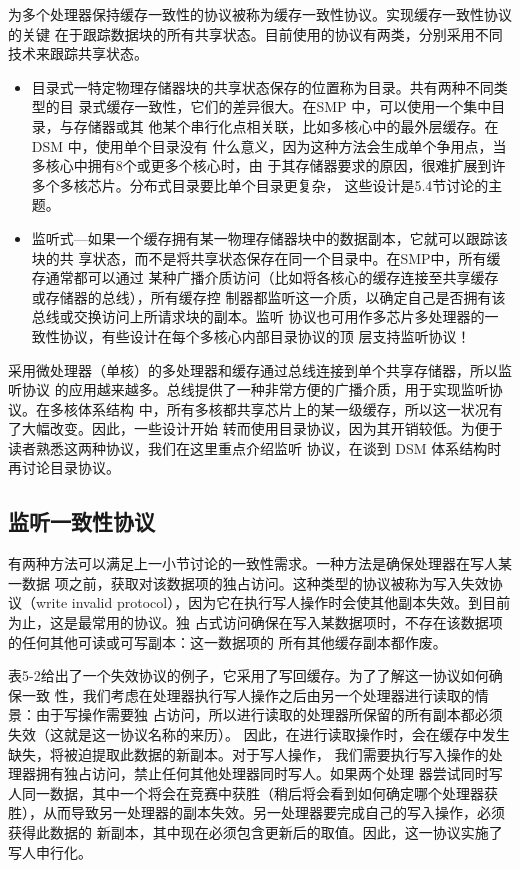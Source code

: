 为多个处理器保持缓存一致性的协议被称为缓存一致性协议。实现缓存一致性协议的关键
在于跟踪数据块的所有共享状态。目前使用的协议有两类，分别采用不同技术来跟踪共享状态。
\begin{itemize}
    \item 目录式一特定物理存储器块的共享状态保存的位置称为目录。共有两种不同类型的目
    录式缓存一致性，它们的差异很大。在SMP 中，可以使用一个集中目录，与存储器或其
    他某个串行化点相关联，比如多核心中的最外层缓存。在 DSM 中，使用单个目录没有
    什么意义，因为这种方法会生成单个争用点，当多核心中拥有8个或更多个核心时，由
    于其存储器要求的原因，很难扩展到许多个多核芯片。分布式目录要比单个目录更复杂，
    这些设计是5.4节讨论的主题。
    \item 监听式—如果一个缓存拥有某一物理存储器块中的数据副本，它就可以跟踪该块的共
    享状态，而不是将共享状态保存在同一个目录中。在SMP中，所有缓存通常都可以通过
    某种广播介质访问（比如将各核心的缓存连接至共享缓存或存储器的总线），所有缓存控
    制器都监听这一介质，以确定自己是否拥有该总线或交换访问上所请求块的副本。监听
    协议也可用作多芯片多处理器的一致性协议，有些设计在每个多核心内部目录协议的顶
    层支持监听协议！
\end{itemize}
采用微处理器（单核）的多处理器和缓存通过总线连接到单个共享存储器，所以监听协议
的应用越来越多。总线提供了一种非常方便的广播介质，用于实现监听协议。在多核体系结构
中，所有多核都共享芯片上的某一级缓存，所以这一状况有了大幅改变。因此，一些设计开始
转而使用目录协议，因为其开销较低。为便于读者熟悉这两种协议，我们在这里重点介绍监听
协议，在谈到 DSM 体系结构时再讨论目录协议。
\subsection{监听一致性协议}
有两种方法可以满足上一小节讨论的一致性需求。一种方法是确保处理器在写人某一数据
项之前，获取对该数据项的独占访问。这种类型的协议被称为写入失效协议（write invalid
protocol），因为它在执行写人操作时会使其他副本失效。到目前为止，这是最常用的协议。独
占式访问确保在写入某数据项时，不存在该数据项的任何其他可读或可写副本：这一数据项的
所有其他缓存副本都作废。

表5-2给出了一个失效协议的例子，它采用了写回缓存。为了了解这一协议如何确保一致
性，我们考虑在处理器执行写人操作之后由另一个处理器进行读取的情景：由于写操作需要独
占访问，所以进行读取的处理器所保留的所有副本都必须失效（这就是这一协议名称的来历）。
因此，在进行读取操作时，会在缓存中发生缺失，将被迫提取此数据的新副本。对于写人操作，
我们需要执行写入操作的处理器拥有独占访问，禁止任何其他处理器同时写人。如果两个处理
器尝试同时写人同一数据，其中一个将会在竞赛中获胜（稍后将会看到如何确定哪个处理器获
胜），从而导致另一处理器的副本失效。另一处理器要完成自己的写入操作，必须获得此数据的
新副本，其中现在必须包含更新后的取值。因此，这一协议实施了写人申行化。

